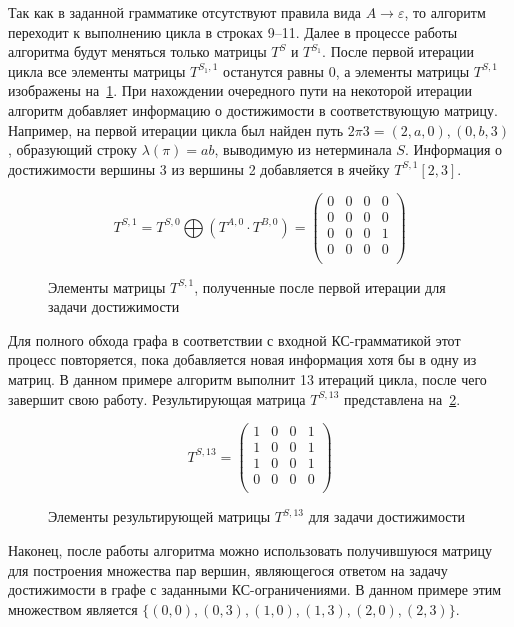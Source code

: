 Так как в заданной грамматике отсутствуют правила вида $A \rightarrow \varepsilon$, то алгоритм переходит к выполнению цикла в строках 9--11. Далее в процессе работы алгоритма будут меняться только матрицы $T^{S}$ и $T^{S_1}$. После первой итерации цикла все элементы матрицы $T^{S_1, 1}$ останутся равны $0$, а элементы матрицы $T^{S, 1}$ изображены на~\cref{ExampleQueryFirstIteration}. При нахождении очередного пути на некоторой итерации алгоритм добавляет информацию о достижимости в соответствующую матрицу. Например, на первой итерации цикла был найден путь $2 \pi 3 = (2, a, 0), (0, b, 3)$, образующий строку $\lambda(\pi) = ab$, выводимую из нетерминала $S$. Информация о достижимости вершины 3 из вершины 2 добавляется в ячейку $T^{S, 1}[2, 3]$. 


\begin{figure}[h]
\[
T^{S,1} = T^{S, 0} \bigoplus (T^{A, 0} \cdot T^{B, 0}) = \begin{pmatrix}
	0 & 0     & 0 & 0       \\
	0 & 0 & 0  & 0 \\
	0       & 0 & 0 & 1 \\
	0       & 0 & 0& 0\\
\end{pmatrix}
\]
\caption{Элементы матрицы $T^{S, 1}$, полученные после первой итерации для задачи достижимости}
\label{ExampleQueryFirstIteration}
\end{figure}

Для полного обхода графа в соответствии с входной КС-грамматикой этот процесс повторяется, пока добавляется новая информация хотя бы в одну из матриц. В данном примере алгоритм выполнит 13 итераций цикла, после чего завершит свою работу. Результирующая матрица $T^{S, 13}$ представлена на~\cref{ExampleQueryFinalMatrices}.

{\footnotesize
\begin{figure}[h]
	\[
	T^{S, 13} = \begin{pmatrix}
	1 & 0     & 0 & 1       \\
	1 & 0 & 0   & 1 \\
	1       & 0 & 0 & 1 \\
	0       & 0 & 0 & 0 \\
	\end{pmatrix}
	\]
	\caption{Элементы результирующей матрицы $T^{S, 13}$ для задачи достижимости}
	\label{ExampleQueryFinalMatrices}
\end{figure}
}

Наконец, после работы алгоритма можно использовать получившуюся матрицу для построения множества пар вершин, являющегося ответом на задачу достижимости в графе с заданными КС-ограничениями. В данном примере этим множеством является $\{(0, 0), (0, 3), (1, 0), (1, 3), (2, 0), (2, 3)\}$.


